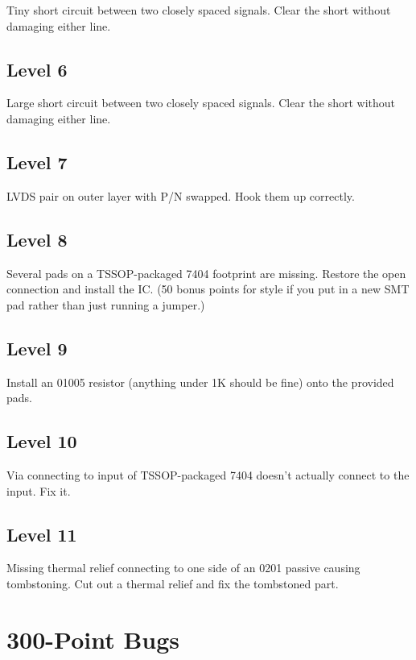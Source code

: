 \documentclass{article}
\begin{document}
Tiny short circuit between two closely spaced signals. Clear the short without damaging either line.

\subsection{Level 6}

Large short circuit between two closely spaced signals. Clear the short without damaging either line.

\subsection{Level 7}

LVDS pair on outer layer with P/N swapped. Hook them up correctly.

\subsection{Level 8}

Several pads on a TSSOP-packaged 7404 footprint are missing. Restore the open connection and install the IC. (50
bonus points for style if you put in a new SMT pad rather than just running a jumper.)

\subsection{Level 9}

Install an 01005 resistor (anything under 1K should be fine) onto the provided pads.

\subsection{Level 10}

Via connecting to input of TSSOP-packaged 7404 doesn't actually connect to the input. Fix it.

\subsection{Level 11}

Missing thermal relief connecting to one side of an 0201 passive causing tombstoning. Cut out a thermal relief and fix
the tombstoned part.

\pagebreak
\section{300-Point Bugs}
\end{document}
